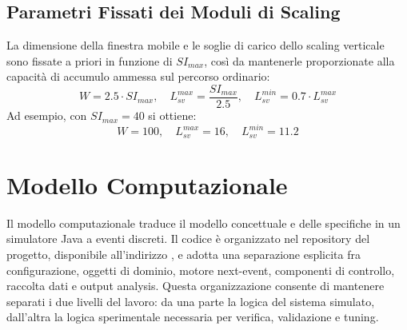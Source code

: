 ﻿\documentclass[a4paper,12pt]{article}
\begin{document}
\subsection{Parametri Fissati dei Moduli di Scaling}
La dimensione della finestra mobile e le soglie di carico dello scaling verticale sono fissate a priori in funzione di $SI_{max}$, così da mantenerle proporzionate alla capacità di accumulo ammessa sul percorso ordinario:
\begin{equation}
    W = 2.5 \cdot SI_{max}, \quad L^{max}_{sv}=\frac{SI_{max}}{2.5}, \quad L^{min}_{sv}=0.7 \cdot L^{max}_{sv}
\end{equation}
Ad esempio, con $SI_{max}=40$ si ottiene:
\begin{equation}
    W = 100, \quad L^{max}_{sv} = 16, \quad L^{min}_{sv}= 11.2
\end{equation}

\clearpage


\section{Modello Computazionale}
Il modello computazionale traduce il modello concettuale e delle specifiche in un simulatore Java a eventi discreti. Il codice è organizzato nel repository del progetto, disponibile all'indirizzo \cite{github-repository}, e adotta una separazione esplicita fra configurazione, oggetti di dominio, motore next-event, componenti di controllo, raccolta dati e output analysis. Questa organizzazione consente di mantenere separati i due livelli del lavoro: da una parte la logica del sistema simulato, dall'altra la logica sperimentale necessaria per verifica, validazione e tuning.
\end{document}
